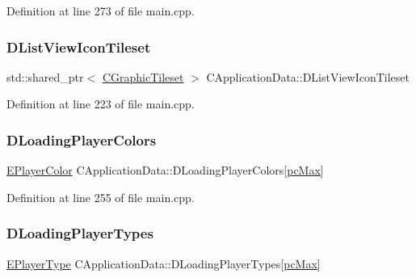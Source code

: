 Definition at line 273 of file main.\+cpp.

\hypertarget{classCApplicationData_ab00db57ca7c624d026ed1fc108bc5b38}{}\label{classCApplicationData_ab00db57ca7c624d026ed1fc108bc5b38} 
\subsubsection{\texorpdfstring{D\+List\+View\+Icon\+Tileset}{DListViewIconTileset}}
{\footnotesize\ttfamily std\+::shared\+\_\+ptr$<$ \hyperlink{classCGraphicTileset}{C\+Graphic\+Tileset} $>$ C\+Application\+Data\+::\+D\+List\+View\+Icon\+Tileset\hspace{0.3cm}{\ttfamily [protected]}}



Definition at line 223 of file main.\+cpp.

\hypertarget{classCApplicationData_ab29b80d90f1201608dcb498cd627a6f9}{}\label{classCApplicationData_ab29b80d90f1201608dcb498cd627a6f9} 
\subsubsection{\texorpdfstring{D\+Loading\+Player\+Colors}{DLoadingPlayerColors}}
{\footnotesize\ttfamily \hyperlink{GameDataTypes_8h_aafb0ca75933357ff28a6d7efbdd7602f}{E\+Player\+Color} C\+Application\+Data\+::\+D\+Loading\+Player\+Colors\mbox{[}\hyperlink{GameDataTypes_8h_aafb0ca75933357ff28a6d7efbdd7602fa594a5c8dd3987f24e8a0f23f1a72cd34}{pc\+Max}\mbox{]}\hspace{0.3cm}{\ttfamily [protected]}}



Definition at line 255 of file main.\+cpp.

\hypertarget{classCApplicationData_a2ac5711b027842d57aa5f8e5a7adc589}{}\label{classCApplicationData_a2ac5711b027842d57aa5f8e5a7adc589} 
\subsubsection{\texorpdfstring{D\+Loading\+Player\+Types}{DLoadingPlayerTypes}}
{\footnotesize\ttfamily \hyperlink{classCApplicationData_ae04b6b340297311972ce1e955196fcaa}{E\+Player\+Type} C\+Application\+Data\+::\+D\+Loading\+Player\+Types\mbox{[}\hyperlink{GameDataTypes_8h_aafb0ca75933357ff28a6d7efbdd7602fa594a5c8dd3987f24e8a0f23f1a72cd34}{pc\+Max}\mbox{]}\hspace{0.3cm}{\ttfamily [protected]}}



